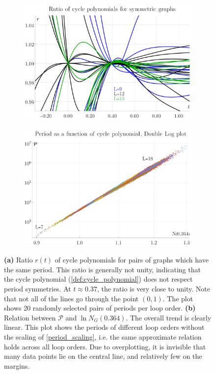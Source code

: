 \documentclass[11pt]{scrartcl}
\numberwithin{equation}{section}
\newcommand{\period}{\mathcal P}
\begin{document}
\begin{figure}[htb]
	\begin{subfigure}{ .49 \linewidth}
		\centering
		\includegraphics[width=\linewidth]{figures/cycle_polynomial_ratio}
		\subcaption{}
		\label{fig:cycle_polynomial_ratio}
	\end{subfigure}
	\begin{subfigure}{ .49 \linewidth}
		\centering
		\includegraphics[width=\linewidth]{figures/cycle_polynomial_approximation}
		\subcaption{}
		\label{fig:cycle_polynomial_approximation}
	\end{subfigure}
	
	\caption{\textbf{(a)} Ratio $r(t)$ of cycle polynomials for pairs of graphs which have the same period. This ratio is generally not unity, indicating that the cycle polynomial (\cref{def:cycle_polynomial}) does not respect period symmetries. At $t\approx 0.37$, the ratio is very close to unity. Note that not all of the lines go through the point $(0,1)$. The plot shows 20 randomly selected pairs of periods per loop order. \textbf{(b)} Relation between $ \period$ and $\ln N_G(0.364)$. The overall trend is clearly linear. This plot shows the periods of different loop orders without the scaling of \cref{period_scaling}, i.e. the same approximate relation holds across all loop orders. Due to overplotting, it is invisible that many data points lie on the central line, and relatively few on the margins.  }
	
\end{figure}
\end{document}
